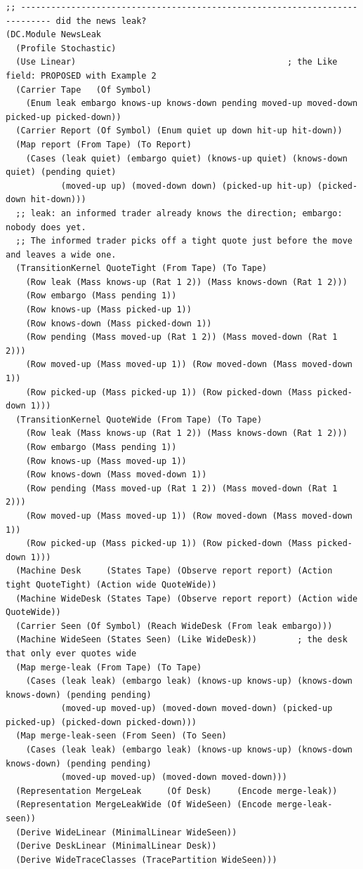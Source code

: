 \documentclass[11pt]{article}
\theoremstyle{definition}
\theoremstyle{plain}
\begin{document}
\begin{lstlisting}[style=mettafull]
;; ---------------------------------------------------------------------------- did the news leak?
(DC.Module NewsLeak
  (Profile Stochastic)
  (Use Linear)                                          ; the Like field: PROPOSED with Example 2
  (Carrier Tape   (Of Symbol)
    (Enum leak embargo knows-up knows-down pending moved-up moved-down picked-up picked-down))
  (Carrier Report (Of Symbol) (Enum quiet up down hit-up hit-down))
  (Map report (From Tape) (To Report)
    (Cases (leak quiet) (embargo quiet) (knows-up quiet) (knows-down quiet) (pending quiet)
           (moved-up up) (moved-down down) (picked-up hit-up) (picked-down hit-down)))
  ;; leak: an informed trader already knows the direction; embargo: nobody does yet.
  ;; The informed trader picks off a tight quote just before the move and leaves a wide one.
  (TransitionKernel QuoteTight (From Tape) (To Tape)
    (Row leak (Mass knows-up (Rat 1 2)) (Mass knows-down (Rat 1 2)))
    (Row embargo (Mass pending 1))
    (Row knows-up (Mass picked-up 1))
    (Row knows-down (Mass picked-down 1))
    (Row pending (Mass moved-up (Rat 1 2)) (Mass moved-down (Rat 1 2)))
    (Row moved-up (Mass moved-up 1)) (Row moved-down (Mass moved-down 1))
    (Row picked-up (Mass picked-up 1)) (Row picked-down (Mass picked-down 1)))
  (TransitionKernel QuoteWide (From Tape) (To Tape)
    (Row leak (Mass knows-up (Rat 1 2)) (Mass knows-down (Rat 1 2)))
    (Row embargo (Mass pending 1))
    (Row knows-up (Mass moved-up 1))
    (Row knows-down (Mass moved-down 1))
    (Row pending (Mass moved-up (Rat 1 2)) (Mass moved-down (Rat 1 2)))
    (Row moved-up (Mass moved-up 1)) (Row moved-down (Mass moved-down 1))
    (Row picked-up (Mass picked-up 1)) (Row picked-down (Mass picked-down 1)))
  (Machine Desk     (States Tape) (Observe report report) (Action tight QuoteTight) (Action wide QuoteWide))
  (Machine WideDesk (States Tape) (Observe report report) (Action wide QuoteWide))
  (Carrier Seen (Of Symbol) (Reach WideDesk (From leak embargo)))
  (Machine WideSeen (States Seen) (Like WideDesk))        ; the desk that only ever quotes wide
  (Map merge-leak (From Tape) (To Tape)
    (Cases (leak leak) (embargo leak) (knows-up knows-up) (knows-down knows-down) (pending pending)
           (moved-up moved-up) (moved-down moved-down) (picked-up picked-up) (picked-down picked-down)))
  (Map merge-leak-seen (From Seen) (To Seen)
    (Cases (leak leak) (embargo leak) (knows-up knows-up) (knows-down knows-down) (pending pending)
           (moved-up moved-up) (moved-down moved-down)))
  (Representation MergeLeak     (Of Desk)     (Encode merge-leak))
  (Representation MergeLeakWide (Of WideSeen) (Encode merge-leak-seen))
  (Derive WideLinear (MinimalLinear WideSeen))
  (Derive DeskLinear (MinimalLinear Desk))
  (Derive WideTraceClasses (TracePartition WideSeen)))


\end{lstlisting}
\end{document}
